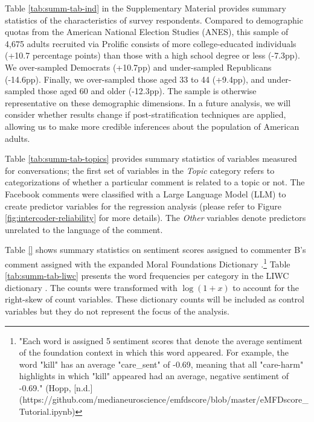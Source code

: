 \documentclass{article}
\begin{document}
Table \ref{tab:summ-tab-ind} in the Supplementary Material provides summary statistics of the characteristics of survey respondents. Compared to demographic quotas from the American National Election Studies (ANES), this sample of 4,675 adults recruited via Prolific consists of more college-educated individuals (+10.7 percentage points) than those with a high school degree or less (-7.3pp). We over-sampled Democrats (+10.7pp) and under-sampled Republicans (-14.6pp). Finally, we over-sampled those aged 33 to 44 (+9.4pp), and under-sampled those aged 60 and older (-12.3pp). The sample is otherwise representative on these demographic dimensions. In a future analysis, we will consider whether results change if post-stratification techniques are applied, allowing us to make more credible inferences about the population of American adults.


Table \ref{tab:summ-tab-topics} provides summary statistics of variables measured for conversations; the first set of variables in the \textit{Topic} category refers to categorizations of whether a particular comment is related to a topic or not. The Facebook comments were classified with a Large Language Model (LLM) to create predictor variables for the regression analysis (please refer to Figure \ref{fig:intercoder-reliability} for more details). The \textit{Other} variables denote predictors unrelated to the language of the comment.


Table \ref{} shows summary statistics on sentiment scores assigned to commenter B's comment assigned with the expanded Moral Foundations Dictionary \citep{hopp2021extended}.\footnote{"Each word is assigned 5 sentiment scores that denote the average sentiment of the foundation context in which this word appeared. For example, the word "kill" has an average "care_sent" of -0.69, meaning that all "care-harm" highlights in which "kill" appeared had an average, negative sentiment of -0.69." (Hopp, [n.d.](https://github.com/medianeuroscience/emfdscore/blob/master/eMFDscore_Tutorial.ipynb)}
Table \ref{tab:summ-tab-liwc} presents the word frequencies per category in the LIWC dictionary \citep{pennebaker_linguistic_2022}. The counts were transformed with $\log(1+x)$ to account for the right-skew of count variables. These dictionary counts will be included as control variables but they do not represent the focus of the analysis.
\end{document}
